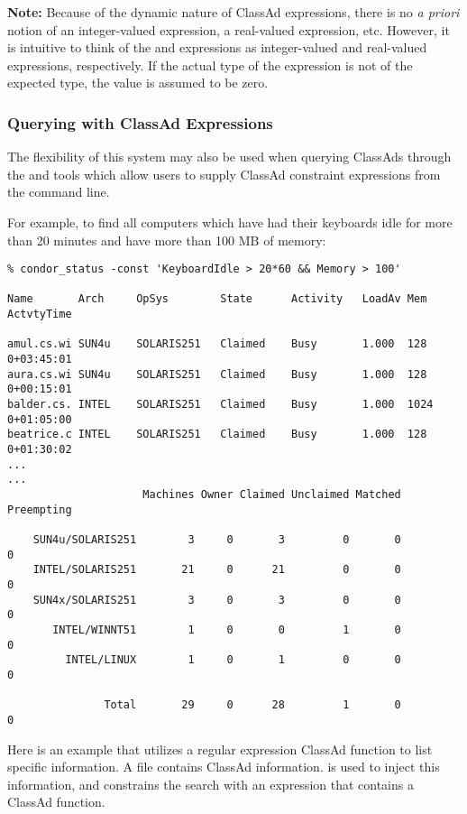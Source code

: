 \textbf{Note:}  Because of the dynamic nature of ClassAd expressions, there
is no \emph{a priori} notion of an integer-valued expression, a real-valued
expression, etc.  However, it is intuitive to think of the 
and  expressions as integer-valued and real-valued expressions,
respectively.  If the actual type of the expression is not of the expected 
type, the value is assumed to be zero.

\subsubsection{Querying with ClassAd Expressions}
The flexibility of this system may also be used when querying ClassAds
through the  and  tools which allow users to
supply ClassAd constraint expressions from the command line.

For example, to find all computers which have had their keyboards idle for 
more than 20 minutes and have more than 100 MB of memory:
\footnotesize
\begin{verbatim}
% condor_status -const 'KeyboardIdle > 20*60 && Memory > 100'

Name       Arch     OpSys        State      Activity   LoadAv Mem  ActvtyTime

amul.cs.wi SUN4u    SOLARIS251   Claimed    Busy       1.000  128   0+03:45:01
aura.cs.wi SUN4u    SOLARIS251   Claimed    Busy       1.000  128   0+00:15:01
balder.cs. INTEL    SOLARIS251   Claimed    Busy       1.000  1024  0+01:05:00
beatrice.c INTEL    SOLARIS251   Claimed    Busy       1.000  128   0+01:30:02
...
...
                     Machines Owner Claimed Unclaimed Matched Preempting

    SUN4u/SOLARIS251        3     0       3         0       0          0
    INTEL/SOLARIS251       21     0      21         0       0          0
    SUN4x/SOLARIS251        3     0       3         0       0          0
       INTEL/WINNT51        1     0       0         1       0          0
         INTEL/LINUX        1     0       1         0       0          0

               Total       29     0      28         1       0          0
\end{verbatim}
\normalsize

Here is an example that utilizes a regular expression
ClassAd function to list specific information.
A file contains ClassAd information.
 is used to inject this information,
and  constrains the search with an expression
that contains a ClassAd function.

